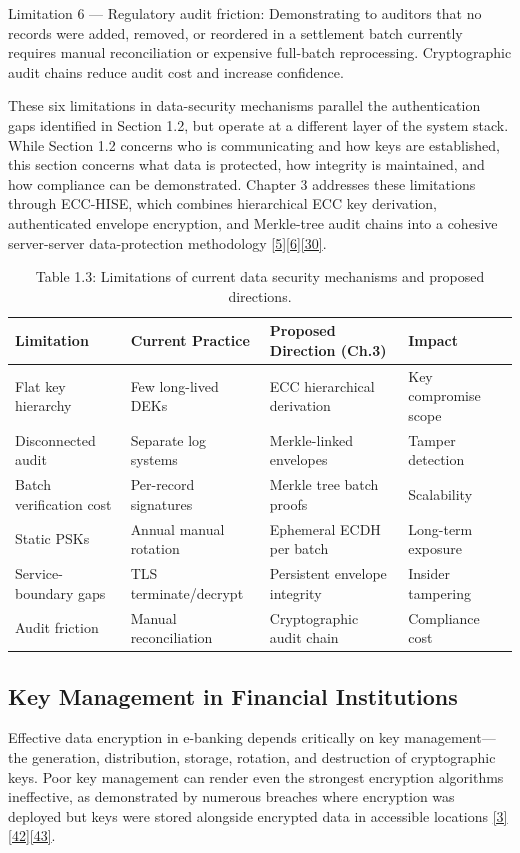\indent Limitation 6 --- Regulatory audit friction: Demonstrating to auditors that no records were added, removed, or reordered in a settlement batch currently requires manual reconciliation or expensive full-batch reprocessing. Cryptographic audit chains reduce audit cost and increase confidence.

\indent These six limitations in data-security mechanisms parallel the authentication gaps identified in Section 1.2, but operate at a different layer of the system stack. While Section 1.2 concerns who is communicating and how keys are established, this section concerns what data is protected, how integrity is maintained, and how compliance can be demonstrated. Chapter 3 addresses these limitations through ECC-HISE, which combines hierarchical ECC key derivation, authenticated envelope encryption, and Merkle-tree audit chains into a cohesive server-server data-protection methodology \hyperref[ref:5]{[5]}\hyperref[ref:6]{[6]}\hyperref[ref:30]{[30]}.

\begin{table}[htbp]
\centering
\begin{tabular}{llll}
\toprule
Limitation & Current Practice & Proposed Direction (Ch.3) & Impact \\
\midrule
Flat key hierarchy & Few long-lived DEKs & ECC hierarchical derivation & Key compromise scope \\
Disconnected audit & Separate log systems & Merkle-linked envelopes & Tamper detection \\
Batch verification cost & Per-record signatures & Merkle tree batch proofs & Scalability \\
Static PSKs & Annual manual rotation & Ephemeral ECDH per batch & Long-term exposure \\
Service-boundary gaps & TLS terminate/decrypt & Persistent envelope integrity & Insider tampering \\
Audit friction & Manual reconciliation & Cryptographic audit chain & Compliance cost \\
\bottomrule
\end{tabular}
\caption{Table 1.3: Limitations of current data security mechanisms and proposed directions.}\label{tbl:1.3}
\end{table}
\subsection{Key Management in Financial Institutions}

\indent Effective data encryption in e-banking depends critically on key management---the generation, distribution, storage, rotation, and destruction of cryptographic keys. Poor key management can render even the strongest encryption algorithms ineffective, as demonstrated by numerous breaches where encryption was deployed but keys were stored alongside encrypted data in accessible locations \hyperref[ref:3]{[3]}\hyperref[ref:42]{[42]}\hyperref[ref:43]{[43]}.

